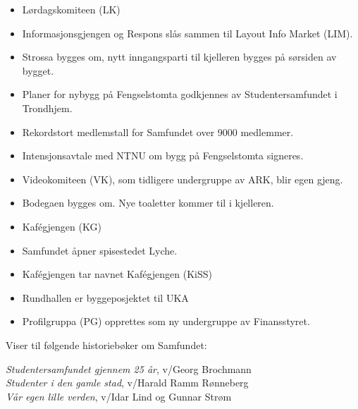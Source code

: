 
\begin{itemize}
  \item Lørdagskomiteen (LK)
\end{itemize}


\begin{itemize}
  \item Informasjonsgjengen og Respons slås sammen til Layout Info Market (LIM).
  \item Strossa bygges om, nytt inngangsparti til kjelleren bygges på sørsiden av bygget.
\end{itemize}


\begin{itemize}
  \item Planer for nybygg på Fengselstomta godkjennes av Studentersamfundet i Trondhjem.
\end{itemize}


\begin{itemize}
  \item Rekordstort medlemstall for Samfundet over 9000 medlemmer.
  \item Intensjonsavtale med NTNU om bygg på Fengselstomta signeres.
  \item Videokomiteen (VK), som tidligere undergruppe av ARK, blir egen gjeng.
  \item Bodegaen bygges om. Nye toaletter kommer til i kjelleren.
  \item Kafégjengen (KG)
\end{itemize}


\begin{itemize}
  \item Samfundet åpner spisestedet Lyche.
  \item Kafégjengen tar navnet Kafégjengen (KiSS)
\end{itemize}


\begin{itemize}
  \item Rundhallen er byggeposjektet til UKA
  \item Profilgruppa (PG) opprettes som ny undergruppe av Finansstyret.
\end{itemize}

Viser til følgende historiebøker om Samfundet:

\textit{Studentersamfundet gjennem 25 år}, v/Georg Brochmann\\
\textit{Studenter i den gamle stad}, v/Harald Ramm Rønneberg\\
\textit{Vår egen lille verden}, v/Idar Lind og Gunnar Strøm\\
